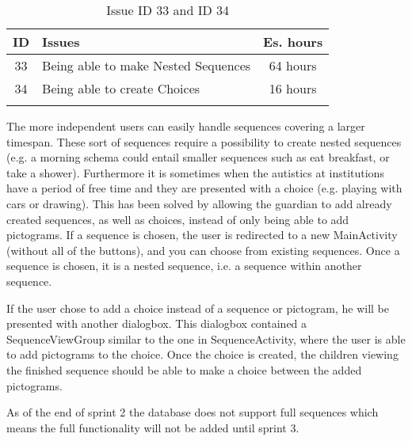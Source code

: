 \begin{longtable} { | c | p{12cm} | c | } 
\hline
	ID 	&	Issues	&		 Es. hours \\\hline
	33 	&	Being able to make Nested Sequences	&	64 hours \\\hline
	34 	&	Being able to create Choices	&	16 hours \\\hline
\caption{Issue ID 33 and ID 34}
\label{tab:spr2_nested}
\end{longtable}

The more independent users can easily handle sequences covering a larger timespan. These sort of sequences require a possibility to create nested sequences (e.g. a morning schema could entail smaller sequences such as eat breakfast, or take a shower). Furthermore it is sometimes when the autistics at institutions have a period of free time and they are presented with a choice (e.g. playing with cars or drawing).
This has been solved by allowing the guardian to add already created sequences, as well as choices, instead of only being able to add pictograms. If a sequence is chosen, the user is redirected to a new MainActivity (without all of the buttons), and you can choose from existing sequences. Once a sequence is chosen, it is a nested sequence, i.e. a sequence within another sequence. 

If the user chose to add a choice instead of a sequence or pictogram, he will be presented with another dialogbox. This dialogbox contained a SequenceViewGroup similar to the one in SequenceActivity, where the user is able to add pictograms to the choice. Once the choice is created, the children viewing the finished sequence should be able to make a choice between the added pictograms.

As of the end of sprint 2 the database does not support full sequences which means the full functionality will not be added until sprint 3.




